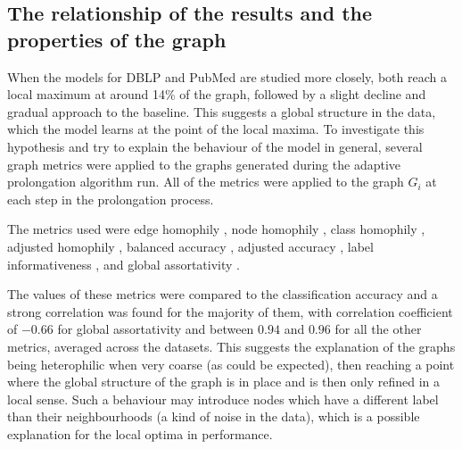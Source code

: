 \subsection{The relationship of the results and the properties of the graph}

When the models for DBLP and PubMed are studied more closely, both reach a local maximum at around 14\% of the graph, followed by a slight decline and gradual approach to the baseline. This suggests a global structure in the data, which the model learns at the point of the local maxima. To investigate this hypothesis and try to explain the behaviour of the model in general, several graph metrics were applied to the graphs generated during the adaptive prolongation algorithm run. All of the metrics were applied to the graph \( G_i \) at each step in the prolongation process.

The metrics used were edge homophily \cite{zhu_beyond_2020}, node homophily \cite{pei_geom-gcn_2020}, class homophily \cite{lim_large_2021}, adjusted homophily \cite{platonov_characterizing_2022}, balanced accuracy \cite{platonov_characterizing_2022}, adjusted accuracy \cite{platonov_characterizing_2022}, label informativeness \cite{platonov_characterizing_2022}, and global assortativity \cite{newman_mixing_2003}.

The values of these metrics were compared to the classification accuracy and a strong correlation was found for the majority of them, with correlation coefficient of \( -0.66 \) for global assortativity and between \( 0.94 \) and \( 0.96 \) for all the other metrics, averaged across the datasets. This suggests the explanation of the graphs being heterophilic when very coarse (as could be expected), then reaching a point where the global structure of the graph is in place and is then only refined in a local sense. Such a behaviour may introduce nodes which have a different label than their neighbourhoods (a kind of noise in the data), which is a possible explanation for the local optima in performance.
